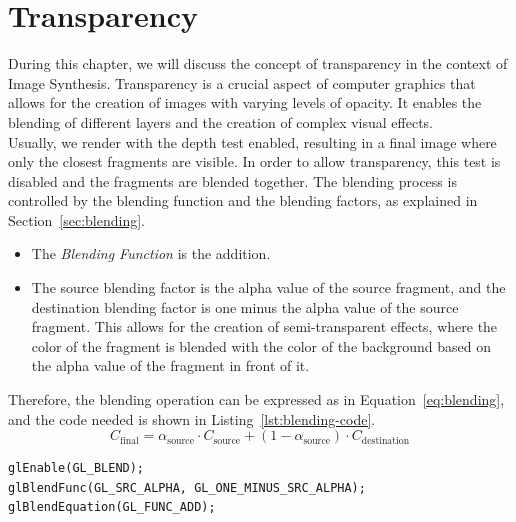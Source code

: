 \chapter{Transparency}\label{chap:transparency}

During this chapter, we will discuss the concept of transparency in the context of Image Synthesis. Transparency is a crucial aspect of computer graphics that allows for the creation of images with varying levels of opacity. It enables the blending of different layers and the creation of complex visual effects.\\

Usually, we render with the depth test enabled, resulting in a final image where only the closest fragments are visible. In order to allow transparency, this test is disabled and the fragments are blended together. The blending process is controlled by the blending function and the blending factors, as explained in Section~\ref{sec:blending}.
\begin{itemize}
    \item The \emph{Blending Function} is the addition.
    \item The source blending factor is the alpha value of the source fragment, and the destination blending factor is one minus the alpha value of the source fragment. This allows for the creation of semi-transparent effects, where the color of the fragment is blended with the color of the background based on the alpha value of the fragment in front of it.
\end{itemize}

Therefore, the blending operation can be expressed as in Equation~\ref{eq:blending}, and the code needed is shown in Listing~\ref{lst:blending-code}.
\begin{equation}\label{eq:blending}
    C_{\text{final}} = \alpha_\text{source} \cdot C_{\text{source}} + (1 - \alpha_\text{source}) \cdot C_{\text{destination}}
\end{equation}
\begin{listing}
    \centering
    \begin{verbatim}
glEnable(GL_BLEND);
glBlendFunc(GL_SRC_ALPHA, GL_ONE_MINUS_SRC_ALPHA);
glBlendEquation(GL_FUNC_ADD);
    \end{verbatim}
    \caption{Code for enabling blending with the specified blending function and factors.}
    \label{lst:blending-code}
\end{listing}


